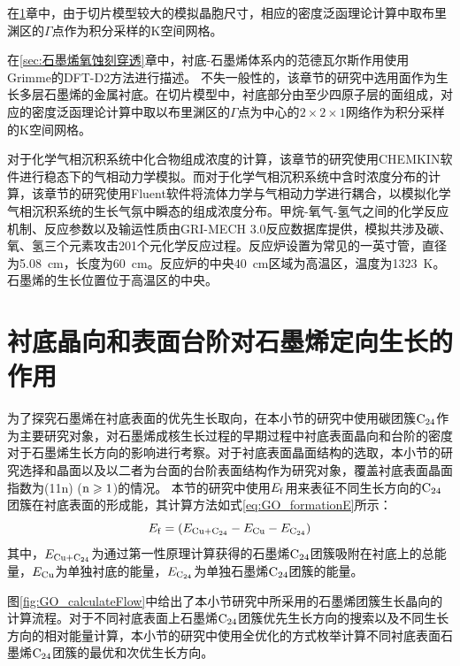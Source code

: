 在\ref{sec:石墨烯优先生长取向}章中，由于切片模型较大的模拟晶胞尺寸，相应的密度泛函理论计算中取布里渊区的$\Gamma$点作为积分采样的K空间网格。

在\ref{sec:石墨烯氧蚀刻穿透}章中，衬底-石墨烯体系内的范德瓦尔斯作用使用Grimme的DFT-D2方法进行描述。
不失一般性的，该章节的研究中选用面作为生长多层石墨烯的金属衬底。在切片模型中，衬底部分由至少四原子层的面组成，对应的密度泛函理论计算中取以布里渊区的$\Gamma$点为中心的$2\times 2\times 1$网络作为积分采样的K空间网格。

对于化学气相沉积系统中化合物组成浓度的计算，该章节的研究使用CHEMKIN软件进行稳态下的气相动力学模拟。而对于化学气相沉积系统中含时浓度分布的计算，该章节的研究使用Fluent软件将流体力学与气相动力学进行耦合，以模拟化学气相沉积系统的生长气氛中瞬态的组成浓度分布。甲烷-氧气-氢气之间的化学反应机制、反应参数以及输运性质由GRI-MECH 3.0反应数据库提供，模拟共涉及碳、氧、氢三个元素攻击201个元化学反应过程。反应炉设置为常见的一英寸管，直径为\SI{5.08}{\centi\metre}，长度为\SI{60}{\centi\metre}。反应炉的中央\SI{40}{\centi\metre}区域为高温区，温度为\SI{1323}{\kelvin}。石墨烯的生长位置位于高温区的中央。

\section{衬底晶向和表面台阶对石墨烯定向生长的作用}
\label{sec:石墨烯优先生长取向}
为了探究石墨烯在衬底表面的优先生长取向，在本小节的研究中使用碳团簇$\rm{C_{24}}$作为主要研究对象，对石墨烯成核生长过程的早期过程中衬底表面晶向和台阶的密度对于石墨烯生长方向的影响进行考察。对于衬底表面晶面结构的选取，本小节的研究选择和晶面以及以二者为台面的台阶表面结构作为研究对象，覆盖衬底表面晶面指数为(11n) ($\rm{n \geqslant 1}$)的情况。
本节的研究中使用$E_{\rm{f}}$用来表征不同生长方向的$\rm{C_{24}}$团簇在衬底表面的形成能，其计算方法如式\eqref{eq:GO_formationE}所示：
\begin{equation}
    \label{eq:GO_formationE}
    E_{\rm{f}}=
    (E_{\rm{Cu+\rm{C_{24}}}}-E_{\rm{Cu}}-E_{\rm{\rm{C_{24}}}})
\end{equation}
其中，$E_{\rm{Cu+\rm{C_{24}}}}$为通过第一性原理计算获得的石墨烯$\rm{C_{24}}$团簇吸附在衬底上的总能量，$E_{\rm{Cu}}$为单独衬底的能量，$E_{\rm{\rm{C_{24}}}}$为单独石墨烯$\rm{C_{24}}$团簇的能量。

图\ref{fig:GO_calculateFlow}中给出了本小节研究中所采用的石墨烯团簇生长晶向的计算流程。对于不同衬底表面上石墨烯$\rm{C_{24}}$团簇优先生长方向的搜索以及不同生长方向的相对能量计算，本小节的研究中使用全优化的方式枚举计算不同衬底表面石墨烯$\rm{C_{24}}$团簇的最优和次优生长方向。

